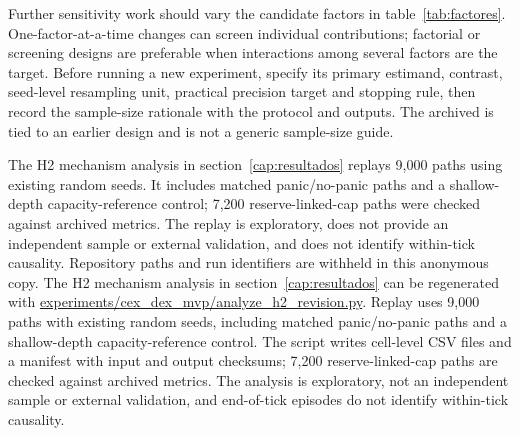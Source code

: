Further sensitivity work should vary the candidate factors in table~\ref{tab:factores}. One-factor-at-a-time changes can screen individual contributions; factorial or screening designs \cite{morris1991factorial,saltelli2010variance} are preferable when interactions among several factors are the target. Before running a new experiment, specify its primary estimand, contrast, seed-level resampling unit, practical precision target and stopping rule, then record the sample-size rationale with the protocol and outputs. The archived  is tied to an earlier design and is not a generic sample-size guide.

\ifdefined\blindreviewmode
The H2 mechanism analysis in section~\ref{cap:resultados} replays 9,000 paths using existing random seeds. It includes matched panic/no-panic paths and a shallow-depth capacity-reference control; 7,200 reserve-linked-cap paths were checked against archived metrics. The replay is exploratory, does not provide an independent sample or external validation, and does not identify within-tick causality. Repository paths and run identifiers are withheld in this anonymous copy.
\else
The H2 mechanism analysis in section~\ref{cap:resultados} can be regenerated with  \url{experiments/cex_dex_mvp/analyze_h2_revision.py}. Replay \code{\HtwoReviewRunID} uses 9,000 paths with existing random seeds, including matched panic/no-panic paths and a shallow-depth capacity-reference control. The script writes cell-level CSV files and a manifest with input and output checksums; 7,200 reserve-linked-cap paths are checked against archived metrics. The analysis is exploratory, not an independent sample or external validation, and end-of-tick episodes do not identify within-tick causality.
\fi
